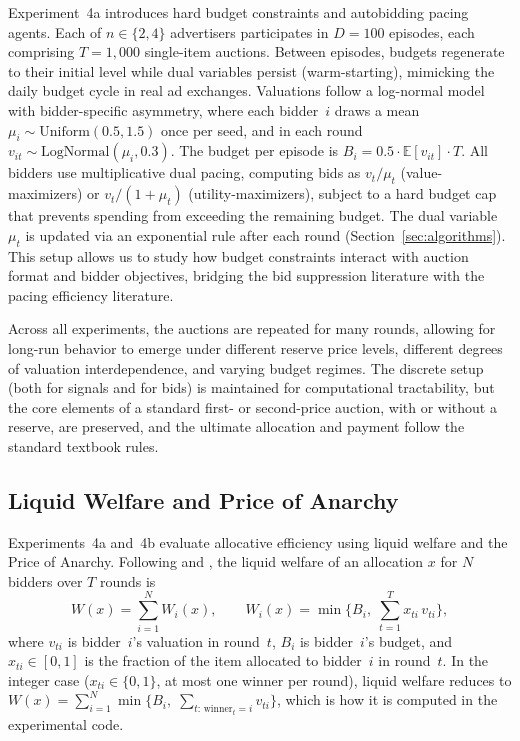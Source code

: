 Experiment~4a introduces hard budget constraints and autobidding pacing agents. Each of $n \in \{2, 4\}$ advertisers participates in $D = 100$ episodes, each comprising $T = 1{,}000$ single-item auctions. Between episodes, budgets regenerate to their initial level while dual variables persist (warm-starting), mimicking the daily budget cycle in real ad exchanges. Valuations follow a log-normal model with bidder-specific asymmetry, where each bidder~$i$ draws a mean $\mu_i \sim \mathrm{Uniform}(0.5, 1.5)$ once per seed, and in each round $v_{it} \sim \mathrm{LogNormal}(\mu_i, 0.3)$. The budget per episode is $B_i = 0.5 \cdot \mathbb{E}[v_{it}] \cdot T$. All bidders use multiplicative dual pacing, computing bids as $v_t / \mu_t$ (value-maximizers) or $v_t / (1 + \mu_t)$ (utility-maximizers), subject to a hard budget cap that prevents spending from exceeding the remaining budget. The dual variable $\mu_t$ is updated via an exponential rule after each round (Section~\ref{sec:algorithms}). This setup allows us to study how budget constraints interact with auction format and bidder objectives, bridging the bid suppression literature with the pacing efficiency literature.

Across all experiments, the auctions are repeated for many rounds, allowing for long-run behavior to emerge under different reserve price levels, different degrees of valuation interdependence, and varying budget regimes. The discrete setup (both for signals and for bids) is maintained for computational tractability, but the core elements of a standard first- or second-price auction, with or without a reserve, are preserved, and the ultimate allocation and payment follow the standard textbook rules.

\subsection{Liquid Welfare and Price of Anarchy}
\label{sec:welfare}

Experiments~4a and~4b evaluate allocative efficiency using liquid welfare and the Price of Anarchy. Following \citet{Gaitonde2023} and \citet{Deng2021TowardsEfficient}, the liquid welfare of an allocation $x$ for $N$ bidders over $T$ rounds is
\begin{equation}
  W(x) = \sum_{i=1}^{N} W_i(x), \qquad
  W_i(x) = \min\!\Big\{B_i,\; \sum_{t=1}^{T} x_{ti}\, v_{ti}\Big\},
  \label{eq:liquid_welfare_def}
\end{equation}
where $v_{ti}$ is bidder~$i$'s valuation in round~$t$, $B_i$ is bidder~$i$'s budget, and $x_{ti} \in [0,1]$ is the fraction of the item allocated to bidder~$i$ in round~$t$. In the integer case ($x_{ti} \in \{0,1\}$, at most one winner per round), liquid welfare reduces to $W(x) = \sum_{i=1}^{N} \min\{B_i,\; \sum_{t:\, \text{winner}_t = i} v_{ti}\}$, which is how it is computed in the experimental code.

